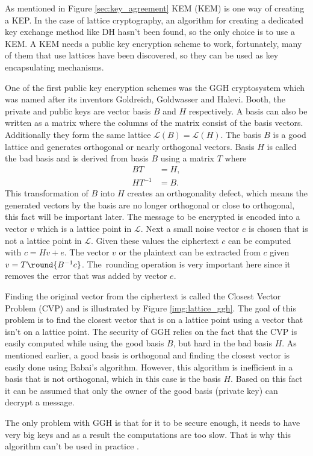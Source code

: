 As mentioned in Figure \ref{sec:key_agreement} KEM (\acl{KEM}) is one way of creating a KEP. In the case of lattice cryptography, an algorithm for creating a dedicated key exchange method like DH hasn't been found, so the only choice is to use a KEM. A KEM needs a public key encryption scheme to work, fortunately, many of them that use lattices have been discovered, so they can be used as key encapsulating mechanisms.

One of the first public key encryption schemes was the GGH cryptosystem which was named after its inventors Goldreich, Goldwasser and Halevi. Booth, the private and public keys are vector basis $B$ and $H$ respectively. A basis can also be written as a matrix where the columns of the matrix consist of the basis vectors. Additionally they form the same lattice $\mathcal{L}(B)=\mathcal{L}(H)$. The basis $B$ is a good lattice and generates orthogonal or nearly orthogonal vectors. Basis $H$ is called the bad basis and is derived from basis $B$ using a matrix $T$ where
\begin{equation}
  \begin{aligned}
    BT&=H, \\
    HT^{-1}&=B.
  \end{aligned}
\end{equation}
This transformation of $B$ into $H$ creates an orthogonality defect, which means the generated vectors by the basis are no longer orthogonal or close to orthogonal, this fact will be important later. The message to be encrypted is encoded into a vector $v$ which is a lattice point in $\mathcal{L}$. Next a small noise vector $e$ is chosen that is not a lattice point in $\mathcal{L}$. Given these values the ciphertext $c$ can be computed with $c = Hv + e$. The vector $v$ or the plaintext can be extracted from $c$ given $v=T \round{B^{-1}c}$. The~rounding operation is very important here since it removes the~error that was added by vector $e$. \cite{Bernstein2009}\cite{Goldreich1997}


Finding the original vector from the ciphertext is called the Closest Vector Problem (CVP) and is illustrated by Figure \ref{img:lattice_ggh}. The goal of this problem is to find the closest vector that is on a lattice point using a vector that isn't on a lattice point. The security of GGH relies on the fact that the CVP is easily computed while using the good basis $B$, but hard in the bad basis $H$. As mentioned earlier, a good basis is orthogonal and finding the closest vector is easily done using Babai's algorithm. However, this algorithm is inefficient in a basis that is not orthogonal, which in this case is the basis $H$. Based on this fact it can be assumed that only the owner of the good basis (private key) can decrypt a message. \cite{Goldreich1997}

The only problem with GGH is that for it to be secure enough, it needs to have very big keys and as a result the computations are too slow. That is why this algorithm can't be used in practice \cite{Bernstein2009}.
